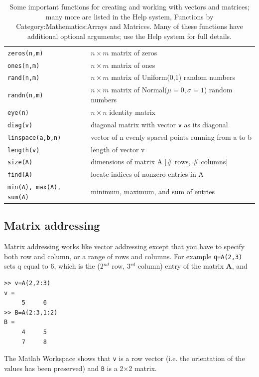 \documentclass [11pt]{article}
\newcommand{\ttt}[1]{\texttt{#1}}
\numberwithin{exercise}{section}
\begin{document}
\begin{table}
\begin{tabular}{p{140pt}p{280pt}}
\hline \hline
{\tt zeros(n,m)} & $n \times m$ matrix of zeros  \\
{\tt ones(n,m)} & $n \times m$ matrix of ones  \\
{\tt rand(n,m)} & $n \times m$ matrix of Uniform(0,1) random numbers \\
{\tt randn(n,m)} & $n \times m$ matrix of Normal($\mu=0,\sigma=1$) random numbers \\
{\tt eye(n)} & $n \times n$ identity matrix \\
{\tt diag(v)} & diagonal matrix with vector \ttt{v} as its diagonal \\
{\tt linspace(a,b,n)} & vector of n evenly spaced points running from a to b \\
{\tt length(v)} & length of vector v \\
{\tt size(A)} & dimensions of matrix A [\# rows, \# columns] \\
{\tt find(A)} & locate indices of nonzero entries in A \\
{\tt min(A), max(A), sum(A)} & minimum, maximum, and sum of entries \\
\hline \hline
\end{tabular}
\caption{Some important functions for creating and working with vectors and matrices; many more
are listed in the Help system, Functions by Category:Mathematics:Arrays and Matrices. Many
of these functions have additional optional arguments; use the Help system for full details.}
\label{MatrixFunctions}
\end{table}

\subsection*{Matrix addressing}
\vspace{-0.15in}  
Matrix addressing works like vector addressing except that you have 
to specify both row and column, or a range of rows and columns. For 
example \texttt{q=A(2,3)} sets q equal to 6, which is the (2$^{nd}$ row, 
3$^{rd}$ column) entry of the matrix \textbf{A}, and 

\begin{verbatim}
>> v=A(2,2:3)
v =
     5     6
>> B=A(2:3,1:2)
B =
     4     5
     7     8
\end{verbatim} 
The Matlab Workspace shows that \texttt{v} is a row vector (i.e. 
the orientation of the values has been preserved) and \texttt{B} is a 
2$\times$2 matrix. 
\end{document}
